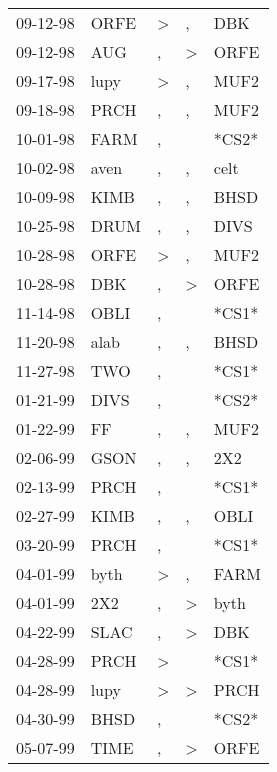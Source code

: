 \begin{supertabular}{lllll}
 09-12-98 &   ORFE &  \textgreater &             , &    DBK \\
 09-12-98 &    AUG &             , &  \textgreater &   ORFE \\
 09-17-98 &   lupy &  \textgreater &             , &   MUF2 \\
 09-18-98 &   PRCH &             , &             , &   MUF2 \\
 10-01-98 &   FARM &             , &               &  *CS2* \\
 10-02-98 &   aven &             , &             , &   celt \\
 10-09-98 &   KIMB &             , &             , &   BHSD \\
 10-25-98 &   DRUM &             , &             , &   DIVS \\
 10-28-98 &   ORFE &  \textgreater &             , &   MUF2 \\
 10-28-98 &    DBK &             , &  \textgreater &   ORFE \\
 11-14-98 &   OBLI &             , &               &  *CS1* \\
 11-20-98 &   alab &             , &             , &   BHSD \\
 11-27-98 &    TWO &             , &               &  *CS1* \\
 01-21-99 &   DIVS &             , &               &  *CS2* \\
 01-22-99 &     FF &             , &             , &   MUF2 \\
 02-06-99 &   GSON &             , &             , &    2X2 \\
 02-13-99 &   PRCH &             , &               &  *CS1* \\
 02-27-99 &   KIMB &             , &             , &   OBLI \\
 03-20-99 &   PRCH &             , &               &  *CS1* \\
 04-01-99 &   byth &  \textgreater &             , &   FARM \\
 04-01-99 &    2X2 &             , &  \textgreater &   byth \\
 04-22-99 &   SLAC &             , &  \textgreater &    DBK \\
 04-28-99 &   PRCH &  \textgreater &               &  *CS1* \\
 04-28-99 &   lupy &  \textgreater &  \textgreater &   PRCH \\
 04-30-99 &   BHSD &             , &               &  *CS2* \\
 05-07-99 &   TIME &             , &  \textgreater &   ORFE \\

\end{supertabular}
